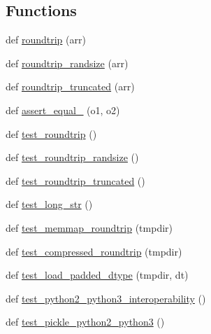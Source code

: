 \subsection*{Functions}
\begin{DoxyCompactItemize}
\item 
def \hyperlink{namespacenumpy_1_1lib_1_1tests_1_1test__format_a80ad335835bcb83e5102b16ad4d2037c}{roundtrip} (arr)
\item 
def \hyperlink{namespacenumpy_1_1lib_1_1tests_1_1test__format_a93e9babba1c86a310c6c6cf967ce56f7}{roundtrip\+\_\+randsize} (arr)
\item 
def \hyperlink{namespacenumpy_1_1lib_1_1tests_1_1test__format_a1a92076022fc349506651684397dcac6}{roundtrip\+\_\+truncated} (arr)
\item 
def \hyperlink{namespacenumpy_1_1lib_1_1tests_1_1test__format_aa0754caf81c963ad3f5da1f072ec12dc}{assert\+\_\+equal\+\_\+} (o1, o2)
\item 
def \hyperlink{namespacenumpy_1_1lib_1_1tests_1_1test__format_a606ddac813b408272c688a5a0db2d403}{test\+\_\+roundtrip} ()
\item 
def \hyperlink{namespacenumpy_1_1lib_1_1tests_1_1test__format_a54157ea675030ec30a286962876eb0ec}{test\+\_\+roundtrip\+\_\+randsize} ()
\item 
def \hyperlink{namespacenumpy_1_1lib_1_1tests_1_1test__format_ae935bd91c98447df5ec89219c76d8e06}{test\+\_\+roundtrip\+\_\+truncated} ()
\item 
def \hyperlink{namespacenumpy_1_1lib_1_1tests_1_1test__format_a5672f95bf3a1861321b85f403a55912e}{test\+\_\+long\+\_\+str} ()
\item 
def \hyperlink{namespacenumpy_1_1lib_1_1tests_1_1test__format_ab4deeb1c5712dd6017a35d069abd1cba}{test\+\_\+memmap\+\_\+roundtrip} (tmpdir)
\item 
def \hyperlink{namespacenumpy_1_1lib_1_1tests_1_1test__format_a1d5cdcb5d5b92f575ac2e1a697932fa8}{test\+\_\+compressed\+\_\+roundtrip} (tmpdir)
\item 
def \hyperlink{namespacenumpy_1_1lib_1_1tests_1_1test__format_a8ff66d261024e1512a7835d702d1d679}{test\+\_\+load\+\_\+padded\+\_\+dtype} (tmpdir, dt)
\item 
def \hyperlink{namespacenumpy_1_1lib_1_1tests_1_1test__format_aff96282e6b02538fd4acd9577194263f}{test\+\_\+python2\+\_\+python3\+\_\+interoperability} ()
\item 
def \hyperlink{namespacenumpy_1_1lib_1_1tests_1_1test__format_aae36a6d5253668dfaffadca76d4f4a50}{test\+\_\+pickle\+\_\+python2\+\_\+python3} ()

\end{DoxyCompactItemize}
